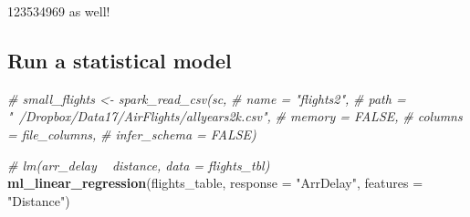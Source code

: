 \documentclass[]{book}
\newenvironment{Shaded}{\begin{snugshade}}{\end{snugshade}}
\newcommand{\KeywordTok}[1]{\textcolor[rgb]{0.13,0.29,0.53}{\textbf{#1}}}
\newcommand{\DataTypeTok}[1]{\textcolor[rgb]{0.13,0.29,0.53}{#1}}
\newcommand{\StringTok}[1]{\textcolor[rgb]{0.31,0.60,0.02}{#1}}
\newcommand{\CommentTok}[1]{\textcolor[rgb]{0.56,0.35,0.01}{\textit{#1}}}
\newcommand{\OperatorTok}[1]{\textcolor[rgb]{0.81,0.36,0.00}{\textbf{#1}}}
\newcommand{\NormalTok}[1]{#1}
\theoremstyle{definition}
\theoremstyle{definition}
\theoremstyle{definition}
\theoremstyle{remark}
\begin{document}
\begin{Shaded}
\end{Shaded}

123534969 as well!

\subsection{Run a statistical model}\label{run-a-statistical-model}

\begin{Shaded}
\begin{Highlighting}[]
\CommentTok{# small_flights <- spark_read_csv(sc, }
\CommentTok{#                              name = "flights2", }
\CommentTok{#                              path = "~/Dropbox/Data17/AirFlights/allyears2k.csv", }
\CommentTok{#                              memory = FALSE, }
\CommentTok{#                              columns = file_columns, }
\CommentTok{#                              infer_schema = FALSE)}
\end{Highlighting}
\end{Shaded}

\begin{Shaded}
\end{Shaded}

\begin{Shaded}
\begin{Highlighting}[]
\CommentTok{# lm(arr_delay ~ distance, data = flights_tbl)}
 \KeywordTok{ml_linear_regression}\NormalTok{(flights_table, }\DataTypeTok{response =} \StringTok{"ArrDelay"}\NormalTok{, }\DataTypeTok{features =} \StringTok{"Distance"}\NormalTok{)}
\end{Highlighting}
\end{Shaded}
\end{document}
